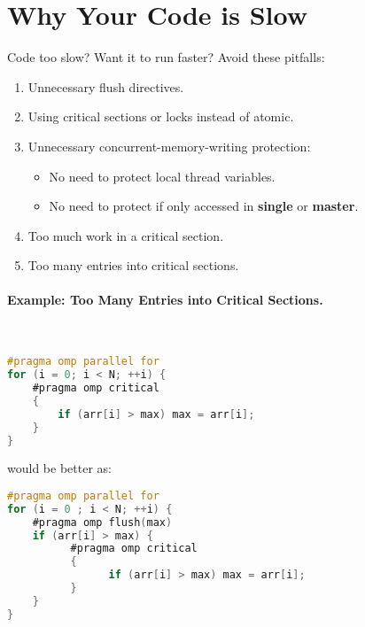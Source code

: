 \section*{Why Your Code is Slow}
Code too slow? Want it to run faster? Avoid these pitfalls:
  \begin{enumerate}
    \item Unnecessary flush directives.
    \item Using critical sections or locks instead of atomic.
    \item Unnecessary concurrent-memory-writing protection:
      \begin{itemize}
        \item No need to protect local thread variables.
        \item No need to protect if only accessed in {\bf single} or
          {\bf master}.
      \end{itemize}
    \item Too much work in a critical section.
    \item Too many entries into critical sections.
  \end{enumerate}

\paragraph{Example: Too Many Entries into Critical Sections.}~

  \begin{lstlisting}[language=C]
#pragma omp parallel for
for (i = 0; i < N; ++i) { 
    #pragma omp critical
    {
        if (arr[i] > max) max = arr[i];
    } 
}
  \end{lstlisting}

would be better as:

  \begin{lstlisting}[language=C]
#pragma omp parallel for
for (i = 0 ; i < N; ++i) { 
    #pragma omp flush(max)
    if (arr[i] > max) {
          #pragma omp critical
          {
                if (arr[i] > max) max = arr[i];
          }
    }
}
\end{lstlisting}





